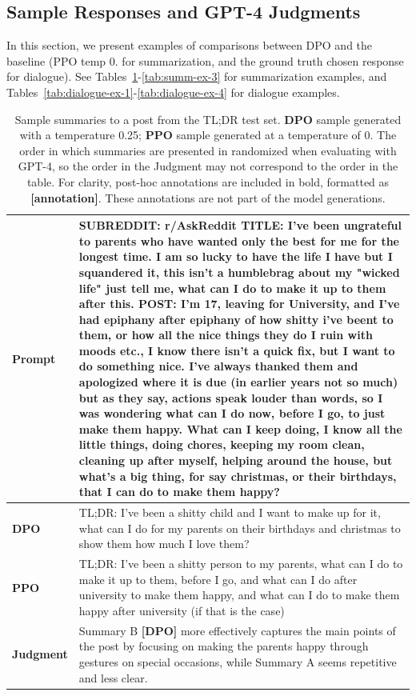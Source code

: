 \documentclass{article}
\begin{document}
\subsection{Sample Responses and GPT-4 Judgments}
In this section, we present examples of comparisons between DPO and the baseline (PPO temp 0. for summarization, and the ground truth chosen response for dialogue). See Tables~\ref{tab:summ-ex-1}-\ref{tab:summ-ex-3} for summarization examples, and Tables~\ref{tab:dialogue-ex-1}-\ref{tab:dialogue-ex-4} for dialogue examples.

\begin{table}
    \centering
    \begin{tabular}{lp{11.5cm}}
        \toprule
        \textbf{Prompt} & SUBREDDIT: r/AskReddit
        TITLE: I've been ungrateful to parents who have wanted only the best for me for the longest time. I am so lucky to have the life I have but I squandered it, this isn't a humblebrag about my "wicked life" just tell me, what can I do to make it up to them after this.
        POST: I'm 17, leaving for University, and I've had epiphany after epiphany of how shitty i've beent to them, or how all the nice things they do I ruin with moods etc., I know there isn't a quick fix, but I want to do something nice. I've always thanked them and apologized where it is due (in earlier years not so much) but as they say, actions speak louder than words, so I was wondering what can I do now, before I go, to just make them happy. What can I keep doing, I know all the little things, doing chores, keeping my room clean, cleaning up after myself, helping around the house, but what's a big thing, for say christmas, or their birthdays, that I can do to make them happy? \\
        \midrule
        \textbf{DPO} & TL;DR: I've been a shitty child and I want to make up for it, what can I do for my parents on their birthdays and christmas to show them how much I love them?\\
        \midrule
        \textbf{PPO} & TL;DR: I've been a shitty person to my parents, what can I do to make it up to them, before I go, and what can I do after university to make them happy, and what can I do to make them happy after university (if that is the case) \\
        \midrule
        \textbf{Judgment} & Summary B \textbf{[DPO]} more effectively captures the main points of the post by focusing on making the parents happy through gestures on special occasions, while Summary A seems repetitive and less clear. \\
        \bottomrule
    \end{tabular}
    \vspace{4mm}
    \caption{Sample summaries to a post from the TL;DR test set. \textbf{DPO} sample generated with a temperature 0.25; \textbf{PPO} sample generated at a temperature of 0. The order in which summaries are presented in randomized when evaluating with GPT-4, so the order in the Judgment may not correspond to the order in the table. For clarity, post-hoc annotations are included in bold, formatted as \textbf{[annotation]}. These annotations are not part of the model generations.}
    \label{tab:summ-ex-1}
\end{table}
\end{document}
